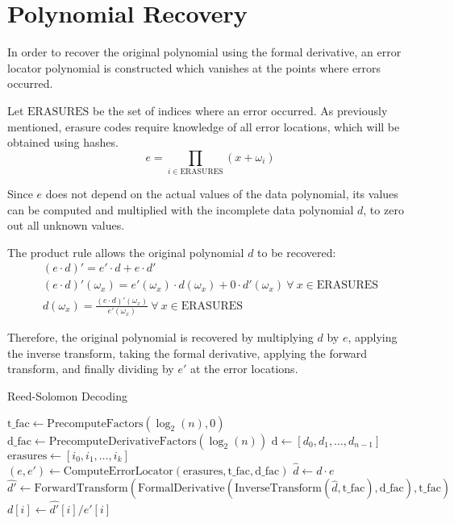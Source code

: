 \section{Polynomial Recovery}

In order to recover the original polynomial using the formal derivative, an error locator polynomial is constructed which vanishes at the points where errors occurred.

Let $\text{ERASURES}$ be the set of indices where an error occurred. As previously mentioned, erasure codes require knowledge of all error locations, which will be obtained using hashes.
\begin{equation}e = \prod_{i \in \text{ERASURES}} (x + \omega_i)\end{equation}

Since $e$ does not depend on the actual values of the data polynomial, its values can be computed and multiplied with the incomplete data polynomial $d$, to zero out all unknown values.

The product rule allows the original polynomial $d$ to be recovered:
\begin{gather}
(e \cdot d)' = e' \cdot d + e \cdot d'\\
(e \cdot d)'(\omega_x) = e'(\omega_x) \cdot d(\omega_x) + 0 \cdot d'(\omega_x)\ \forall\ x \in \text{ERASURES}\\
d(\omega_x) = \frac{(e \cdot d)'(\omega_x)}{e'(\omega_x)}\ \forall\ x \in \text{ERASURES}
\end{gather}

Therefore, the original polynomial is recovered by multiplying $d$ by $e$, applying the inverse transform, taking the formal derivative, applying the forward transform,
and finally dividing by $e'$ at the error locations.

\begin{algorithm}
    \caption{Reed-Solomon Decoding}
    \begin{algorithmic}
        \State $\text{t\_fac} \gets \text{PrecomputeFactors}(\log_2(n), 0)$
        \State $\text{d\_fac} \gets \text{PrecomputeDerivativeFactors}(\log_2(n))$
        \State $\text{d} \gets [d_0, d_1, \ldots, d_{n - 1}]$ 
        \State $\text{erasures} \gets [i_0, i_1, \ldots, i_k]$ 
        \State $(e, e') \gets \text{ComputeErrorLocator}(\text{erasures}, \text{t\_fac}, \text{d\_fac})$
        \State $\hat{d} \gets d \cdot e$ 
        \State $\hat{d'} \gets \text{ForwardTransform}(\text{FormalDerivative}(\text{InverseTransform}(\hat{d}, \text{t\_fac}), \text{d\_fac}), \text{t\_fac})$
            \State $d[i] \gets \hat{d'}[i] / e'[i]$
        \EndFor
    \end{algorithmic}
\end{algorithm}

